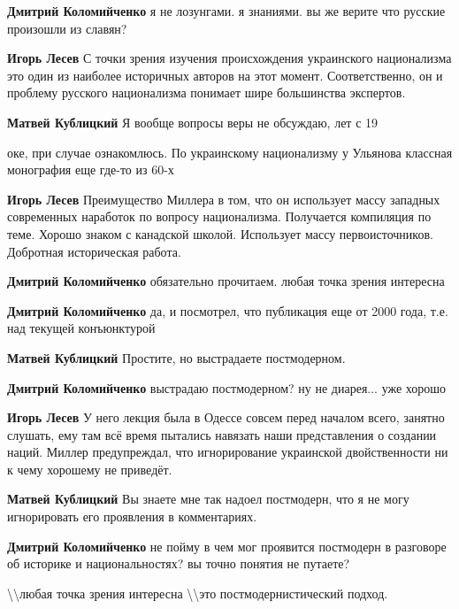 \begin{itemize}
\begin{itemize}
\textbf{Дмитрий Коломийченко} я не лозунгами. я знаниями. вы же верите что русские произошли из славян?

\textbf{Игорь Лесев} С точки зрения изучения происхождения украинского национализма это один из наиболее историчных авторов на этот момент. Соответственно, он и проблему русского национализма понимает шире большинства экспертов.

\textbf{Матвей Кублицкий} Я вообще вопросы веры не обсуждаю, лет с 19

оке, при случае ознакомлюсь. По украинскому национализму у Ульянова классная монография еще где-то из 60-х

\textbf{Игорь Лесев} Преимущество Миллера в том, что он использует массу западных современных наработок по вопросу национализма. Получается компиляция по теме. Хорошо знаком с канадской школой. Использует массу первоисточников. Добротная историческая работа.

\textbf{Дмитрий Коломийченко} обязательно прочитаем. любая точка зрения интересна

\textbf{Дмитрий Коломийченко} да, и посмотрел, что публикация еще от 2000 года, т.е. над текущей конъюнктурой

\textbf{Матвей Кублицкий} Простите, но выстрадаете постмодерном.

\textbf{Дмитрий Коломийченко} выстрадаю постмодерном? ну не диарея... уже хорошо

\textbf{Игорь Лесев} У него лекция была в Одессе совсем перед началом всего, занятно слушать, ему там всё время пытались навязать наши представления о создании наций. Миллер предупреждал, что игнорирование украинской двойственности ни к чему хорошему не приведёт.

\textbf{Матвей Кублицкий} Вы знаете мне так надоел постмодерн, что я не могу игнорировать его проявления в комментариях.

\textbf{Дмитрий Коломийченко} не пойму в чем мог проявится постмодерн в разговоре об историке и национальностях? вы точно понятия не путаете?

\textbackslash\textbackslash любая точка зрения интересна \textbackslash\textbackslash это постмодернистический подход.


\end{itemize}
\end{itemize}
